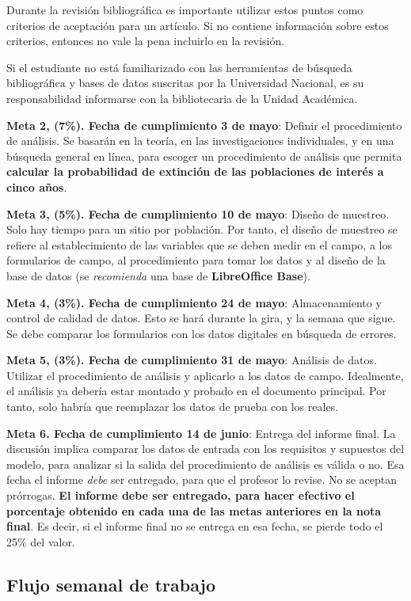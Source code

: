 \documentclass[12pt,letterpaper,]{book}
\begin{document}
Durante la revisión bibliográfica es importante utilizar estos puntos
como criterios de aceptación para un artículo. Si no contiene
información sobre estos criterios, entonces no vale la pena incluirlo en
la revisión.

Si el estudiante no está familiarizado con las herramientas de búsqueda
bibliográfica y bases de datos suscritas por la Universidad Nacional, es
su responsabilidad informarse con la bibliotecaria de la Unidad
Académica.

\textbf{Meta 2, (7\%). Fecha de cumplimiento 3 de mayo}: Definir el
procedimiento de análisis. Se basarán en la teoría, en las
investigaciones individuales, y en una búsqueda general en línea, para
escoger un procedimiento de análisis que permita \textbf{calcular la
probabilidad de extinción de las poblaciones de interés a cinco años}.

\textbf{Meta 3, (5\%). Fecha de cumplimiento 10 de mayo}: Diseño de
muestreo. Solo hay tiempo para un sitio por población. Por tanto, el
diseño de muestreo se refiere al establecimiento de las variables que se
deben medir en el campo, a los formularios de campo, al procedimiento
para tomar los datos y al diseño de la base de datos (se
\emph{recomienda} una base de \textbf{LibreOffice Base}).

\textbf{Meta 4, (3\%). Fecha de cumplimiento 24 de mayo}: Almacenamiento
y control de calidad de datos. Esto se hará durante la gira, y la semana
que sigue. Se debe comparar los formularios con los datos digitales en
búsqueda de errores.

\textbf{Meta 5, (3\%). Fecha de cumplimiento 31 de mayo}: Análisis de
datos. Utilizar el procedimiento de análisis y aplicarlo a los datos de
campo. Idealmente, el análisis ya debería estar montado y probado en el
documento principal. Por tanto, solo habría que reemplazar los datos de
prueba con los reales.

\textbf{Meta 6. Fecha de cumplimiento 14 de junio}: Entrega del informe
final. La discusión implica comparar los datos de entrada con los
requisitos y supuestos del modelo, para analizar si la salida del
procedimiento de análisis es válida o no. Esa fecha el informe
\emph{debe} ser entregado, para que el profesor lo revise. No se aceptan
prórrogas. \textbf{El informe debe ser entregado, para hacer efectivo el
porcentaje obtenido en cada una de las metas anteriores en la nota
final}. Es decir, si el informe final no se entrega en esa fecha, se
pierde todo el 25\% del valor.

\subsection{Flujo semanal de trabajo}\label{flujo-semanal-de-trabajo}
\end{document}
